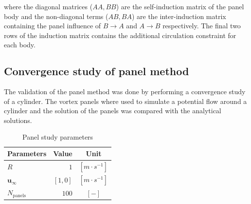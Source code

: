 where the diagonal matrices ($AA, BB$) are the self-induction matrix of the panel body and the non-diagonal terms ($AB,BA$) are the inter-induction matrix containing the panel influence of $B\rightarrow A$ and $A\rightarrow B$ respectively. The final two rows of the induction matrix contains the additional circulation constraint for each body.



%
\subsection{Convergence study of panel method}
The validation of the panel method was done by performing a convergence study of a cylinder. The vortex panels where used to simulate a potential flow around a cylinder and the solution of the panels was compared with the analytical solutions.

	\begin{table}[b]
	    \centering
	    \begin{tabular}{ l r c }
	        \hline
	        Parameters\T\B              & Value 	& Unit    \\
	        \hline
	        $R$\T                     	& $1$	    & $[m\cdot s^{-1}]$ \\
	        $\mathbf{u}_{\infty}$ 		& $\left[1, 0\right]$  	& $[m\cdot s^{-1}]$ \\
	        $N_{\mathrm{panels}}$\B     & $100$  	& $[-]$   \\
	        \hline
	    \end{tabular}
	    \caption{Panel study parameters}
	    \label{tab:panelParams}
	\end{table}

